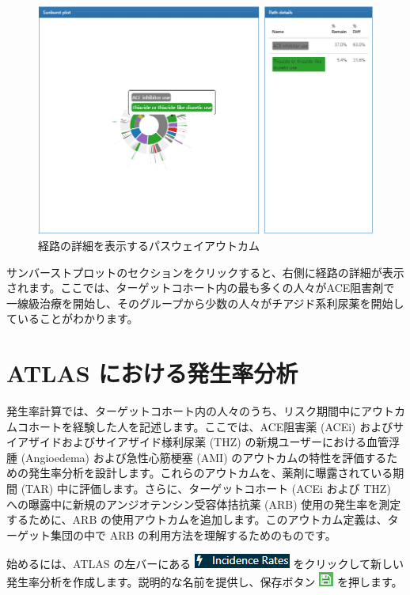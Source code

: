 \documentclass[
  11pt]{book}
\theoremstyle{definition}
\theoremstyle{definition}
\theoremstyle{definition}
\theoremstyle{definition}
\theoremstyle{remark}
\begin{document}
\begin{figure}

{\centering \includegraphics[width=1\linewidth]{images/Characterization/atlasPathwaysResultsPathDetails} 

}

\caption{経路の詳細を表示するパスウェイアウトカム}\label{fig:atlasPathwaysResultsPathDetails}
\end{figure}

サンバーストプロットのセクションをクリックすると、右側に経路の詳細が表示されます。ここでは、ターゲットコホート内の最も多くの人々がACE阻害剤で一線級治療を開始し、そのグループから少数の人々がチアジド系利尿薬を開始していることがわかります。

\section{ATLAS における発生率分析}\label{atlas-ux306bux304aux3051ux308bux767aux751fux7387ux5206ux6790}

発生率計算では、ターゲットコホート内の人々のうち、リスク期間中にアウトカムコホートを経験した人を記述します。ここでは、ACE阻害薬 (ACEi) およびサイアザイドおよびサイアザイド様利尿薬 (THZ) の新規ユーザーにおける血管浮腫 (Angioedema) および急性心筋梗塞 (AMI) のアウトカムの特性を評価するための発生率分析を設計します。これらのアウトカムを、薬剤に曝露されている期間 (TAR) 中に評価します。さらに、ターゲットコホート (ACEi および THZ) への曝露中に新規のアンジオテンシン受容体拮抗薬 (ARB) 使用の発生率を測定するために、ARB の使用アウトカムを追加します。このアウトカム定義は、ターゲット集団の中で ARB の利用方法を理解するためのものです。

始めるには、ATLAS の左バーにある \includegraphics{images/Characterization/atlasIncidenceMenuItem.png} をクリックして新しい発生率分析を作成します。説明的な名前を提供し、保存ボタン \includegraphics{images/PopulationLevelEstimation/save.png} を押します。
\end{document}

